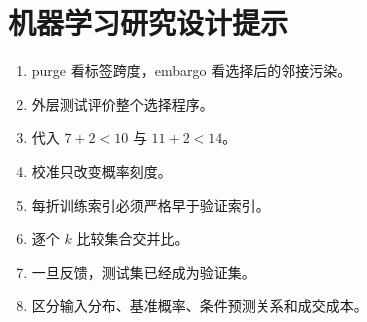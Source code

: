 \chapter{机器学习研究设计提示}
\begin{enumerate}[leftmargin=*]
  \item purge 看标签跨度，embargo 看选择后的邻接污染。
  \item 外层测试评价整个选择程序。
  \item 代入 $7+2<10$ 与 $11+2<14$。
  \item 校准只改变概率刻度。
  \item 每折训练索引必须严格早于验证索引。
  \item 逐个 $k$ 比较集合交并比。
  \item 一旦反馈，测试集已经成为验证集。
  \item 区分输入分布、基准概率、条件预测关系和成交成本。
\end{enumerate}
